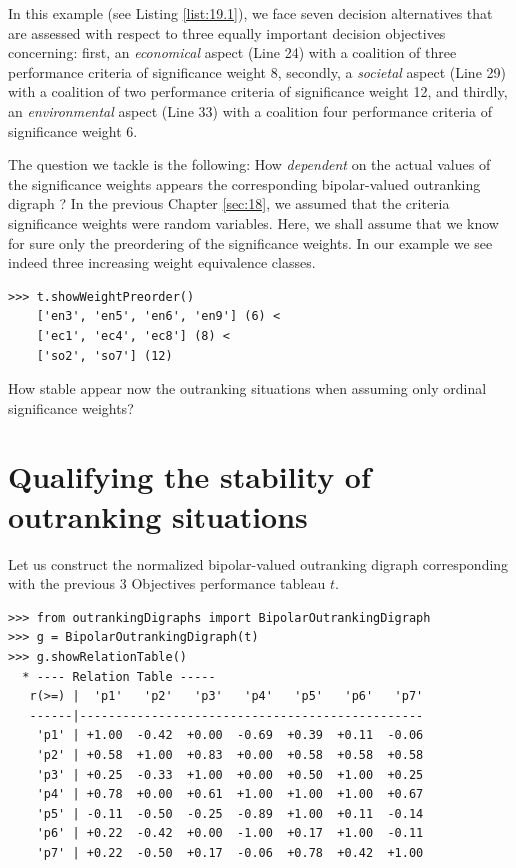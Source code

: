 In this example (see Listing \ref{list:19.1}), we face seven decision alternatives that are assessed with respect to three equally important decision objectives concerning: first, an \emph{economical} aspect (Line 24) with a coalition of three performance criteria of significance weight 8, secondly, a \emph{societal} aspect (Line 29) with a coalition of two performance criteria of significance weight 12, and thirdly, an \emph{environmental} aspect (Line 33) with a coalition four performance criteria of significance weight 6.

The question we tackle is the following: How \emph{dependent} on the actual values of the significance weights appears the corresponding bipolar-valued outranking digraph ? In the previous Chapter \ref{sec:18}, we assumed that the criteria significance weights were random variables. Here, we shall assume that we know for sure only the preordering of the significance weights. In our example we see indeed three increasing weight equivalence classes.

\begin{lstlisting}[caption={The significance weights preorder},label=list:19.2]
>>> t.showWeightPreorder()
    ['en3', 'en5', 'en6', 'en9'] (6) <
    ['ec1', 'ec4', 'ec8'] (8) <
    ['so2', 'so7'] (12)
\end{lstlisting}

How stable appear now the outranking situations when assuming only ordinal significance weights?

\section{Qualifying the stability of outranking situations}
\label{sec:19.2}

Let us construct the normalized bipolar-valued outranking digraph corresponding with the previous 3 Objectives performance tableau $t$.

\begin{lstlisting}[caption={Example Bipolar Outranking Digraph},label=list:19.3]
>>> from outrankingDigraphs import BipolarOutrankingDigraph
>>> g = BipolarOutrankingDigraph(t)
>>> g.showRelationTable()
  * ---- Relation Table -----
   r(>=) |  'p1'   'p2'   'p3'   'p4'   'p5'   'p6'   'p7'   
   ------|------------------------------------------------
    'p1' | +1.00  -0.42  +0.00  -0.69  +0.39  +0.11  -0.06  
    'p2' | +0.58  +1.00  +0.83  +0.00  +0.58  +0.58  +0.58  
    'p3' | +0.25  -0.33  +1.00  +0.00  +0.50  +1.00  +0.25  
    'p4' | +0.78  +0.00  +0.61  +1.00  +1.00  +1.00  +0.67  
    'p5' | -0.11  -0.50  -0.25  -0.89  +1.00  +0.11  -0.14  
    'p6' | +0.22  -0.42  +0.00  -1.00  +0.17  +1.00  -0.11  
    'p7' | +0.22  -0.50  +0.17  -0.06  +0.78  +0.42  +1.00  
\end{lstlisting}

